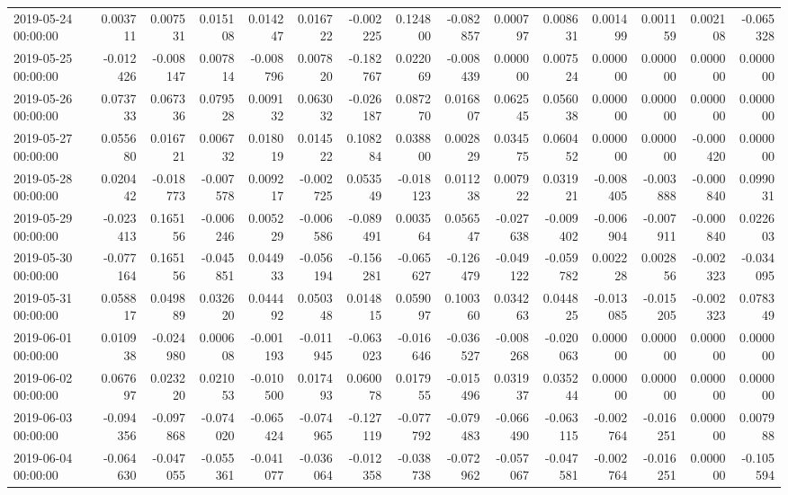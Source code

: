 \begin{tabular}{lrrrrrrrrrrrrrr}
2019-05-24 00:00:00 & 0.003711 & 0.007531 & 0.015108 & 0.014247 & 0.016722 & -0.002225 & 0.124800 & -0.082857 & 0.000797 & 0.008631 & 0.001499 & 0.001159 & 0.002108 & -0.065328 \\
2019-05-25 00:00:00 & -0.012426 & -0.008147 & 0.007814 & -0.008796 & 0.007820 & -0.182767 & 0.022069 & -0.008439 & 0.000000 & 0.007524 & 0.000000 & 0.000000 & 0.000000 & 0.000000 \\
2019-05-26 00:00:00 & 0.073733 & 0.067336 & 0.079528 & 0.009132 & 0.063032 & -0.026187 & 0.087270 & 0.016807 & 0.062545 & 0.056038 & 0.000000 & 0.000000 & 0.000000 & 0.000000 \\
2019-05-27 00:00:00 & 0.055680 & 0.016721 & 0.006732 & 0.018019 & 0.014522 & 0.108284 & 0.038800 & 0.002829 & 0.034575 & 0.060452 & 0.000000 & 0.000000 & -0.000420 & 0.000000 \\
2019-05-28 00:00:00 & 0.020442 & -0.018773 & -0.007578 & 0.009217 & -0.002725 & 0.053549 & -0.018123 & 0.011238 & 0.007922 & 0.031921 & -0.008405 & -0.003888 & -0.000840 & 0.099031 \\
2019-05-29 00:00:00 & -0.023413 & 0.165156 & -0.006246 & 0.005229 & -0.006586 & -0.089491 & 0.003564 & 0.056547 & -0.027638 & -0.009402 & -0.006904 & -0.007911 & -0.000840 & 0.022603 \\
2019-05-30 00:00:00 & -0.077164 & 0.165156 & -0.045851 & 0.044933 & -0.056194 & -0.156281 & -0.065627 & -0.126479 & -0.049122 & -0.059782 & 0.002228 & 0.002856 & -0.002323 & -0.034095 \\
2019-05-31 00:00:00 & 0.058817 & 0.049889 & 0.032620 & 0.044492 & 0.050348 & 0.014815 & 0.059097 & 0.100360 & 0.034263 & 0.044825 & -0.013085 & -0.015205 & -0.002323 & 0.078349 \\
2019-06-01 00:00:00 & 0.010938 & -0.024980 & 0.000608 & -0.001193 & -0.011945 & -0.063023 & -0.016646 & -0.036527 & -0.008268 & -0.020063 & 0.000000 & 0.000000 & 0.000000 & 0.000000 \\
2019-06-02 00:00:00 & 0.067697 & 0.023220 & 0.021053 & -0.010500 & 0.017493 & 0.060078 & 0.017955 & -0.015496 & 0.031937 & 0.035244 & 0.000000 & 0.000000 & 0.000000 & 0.000000 \\
2019-06-03 00:00:00 & -0.094356 & -0.097868 & -0.074020 & -0.065424 & -0.074965 & -0.127119 & -0.077792 & -0.079483 & -0.066490 & -0.063115 & -0.002764 & -0.016251 & 0.000000 & 0.007988 \\
2019-06-04 00:00:00 & -0.064630 & -0.047055 & -0.055361 & -0.041077 & -0.036064 & -0.012358 & -0.038738 & -0.072962 & -0.057067 & -0.047581 & -0.002764 & -0.016251 & 0.000000 & -0.105594 \\

\end{tabular}

